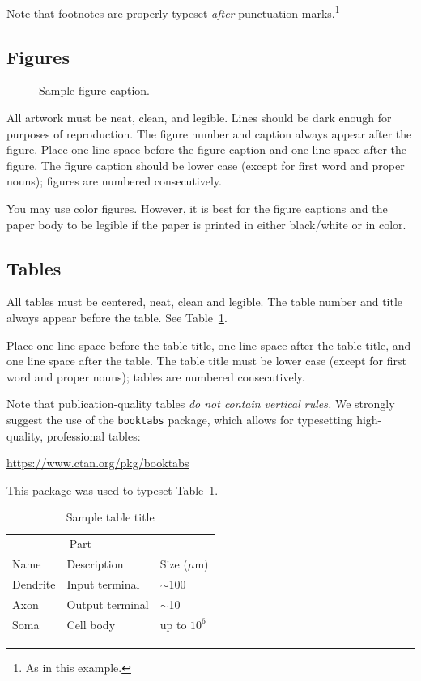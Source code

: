 \documentclass{article}
\begin{document}
Note that footnotes are properly typeset \emph{after} punctuation
marks.\footnote{As in this example.}

\subsection{Figures}

\begin{figure}
  \centering
  \fbox{\rule[-.5cm]{0cm}{4cm} \rule[-.5cm]{4cm}{0cm}}
  \caption{Sample figure caption.}
\end{figure}

All artwork must be neat, clean, and legible. Lines should be dark enough for
purposes of reproduction. The figure number and caption always appear after the
figure. Place one line space before the figure caption and one line space after
the figure. The figure caption should be lower case (except for first word and
proper nouns); figures are numbered consecutively.

You may use color figures.  However, it is best for the figure captions and the
paper body to be legible if the paper is printed in either black/white or in
color.

\subsection{Tables}

All tables must be centered, neat, clean and legible.  The table number and
title always appear before the table.  See Table~\ref{sample-table}.

Place one line space before the table title, one line space after the
table title, and one line space after the table. The table title must
be lower case (except for first word and proper nouns); tables are
numbered consecutively.

Note that publication-quality tables \emph{do not contain vertical rules.} We
strongly suggest the use of the \verb+booktabs+ package, which allows for
typesetting high-quality, professional tables:
\begin{center}
  \url{https://www.ctan.org/pkg/booktabs}
\end{center}
This package was used to typeset Table~\ref{sample-table}.

\begin{table}
  \caption{Sample table title}
  \label{sample-table}
  \centering
  \begin{tabular}{lll}
    \toprule
    \multicolumn{2}{c}{Part}                   \\
    \cmidrule(r){1-2}
    Name     & Description     & Size ($\mu$m) \\
    \midrule
    Dendrite & Input terminal  & $\sim$100     \\
    Axon     & Output terminal & $\sim$10      \\
    Soma     & Cell body       & up to $10^6$  \\
    \bottomrule
  \end{tabular}
\end{table}
\end{document}
